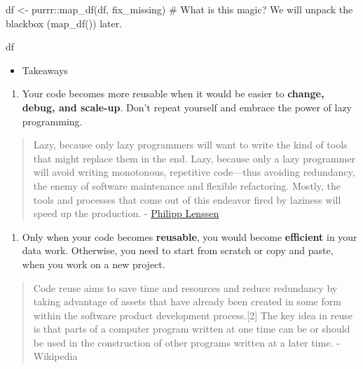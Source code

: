 \documentclass[
  letterpaper,
  DIV=11,
  numbers=noendperiod]{scrreprt}
\newenvironment{Shaded}{\begin{snugshade}}{\end{snugshade}}
\newcommand{\CommentTok}[1]{\textcolor[rgb]{0.37,0.37,0.37}{#1}}
\newcommand{\FunctionTok}[1]{\textcolor[rgb]{0.28,0.35,0.67}{#1}}
\newcommand{\NormalTok}[1]{\textcolor[rgb]{0.00,0.23,0.31}{#1}}
\newcommand{\OtherTok}[1]{\textcolor[rgb]{0.00,0.23,0.31}{#1}}
\newcommand{\SpecialCharTok}[1]{\textcolor[rgb]{0.37,0.37,0.37}{#1}}
\providecommand{\tightlist}{%
  \setlength{\itemsep}{0pt}\setlength{\parskip}{0pt}}\usepackage{longtable,booktabs,array}
\begin{document}
\begin{Shaded}
\begin{Highlighting}[]
\NormalTok{df }\OtherTok{\textless{}{-}}\NormalTok{ purrr}\SpecialCharTok{::}\FunctionTok{map\_df}\NormalTok{(df, fix\_missing) }\CommentTok{\# What is this magic? We will unpack the blackbox (\textasciigrave{}map\_df()\textasciigrave{}) later.}

\NormalTok{df}
\end{Highlighting}
\end{Shaded}

\begin{itemize}
\tightlist
\item
  Takeaways
\end{itemize}

\begin{enumerate}
\def\labelenumi{\arabic{enumi}.}
\tightlist
\item
  Your code becomes more reusable when it would be easier to
  \textbf{change, debug, and scale-up}. Don't repeat yourself and
  embrace the power of lazy programming.
\end{enumerate}

\begin{quote}
Lazy, because only lazy programmers will want to write the kind of tools
that might replace them in the end. Lazy, because only a lazy programmer
will avoid writing monotonous, repetitive code---thus avoiding
redundancy, the enemy of software maintenance and flexible refactoring.
Mostly, the tools and processes that come out of this endeavor fired by
laziness will speed up the production. -
\href{http://blogoscoped.com/archive/2005-08-24-n14.html}{Philipp
Lenssen}
\end{quote}

\begin{enumerate}
\def\labelenumi{\arabic{enumi}.}
\setcounter{enumi}{1}
\tightlist
\item
  Only when your code becomes \textbf{reusable}, you would become
  \textbf{efficient} in your data work. Otherwise, you need to start
  from scratch or copy and paste, when you work on a new project.
\end{enumerate}

\begin{quote}
Code reuse aims to save time and resources and reduce redundancy by
taking advantage of assets that have already been created in some form
within the software product development process.{[}2{]} The key idea in
reuse is that parts of a computer program written at one time can be or
should be used in the construction of other programs written at a later
time. - Wikipedia
\end{quote}
\end{document}
